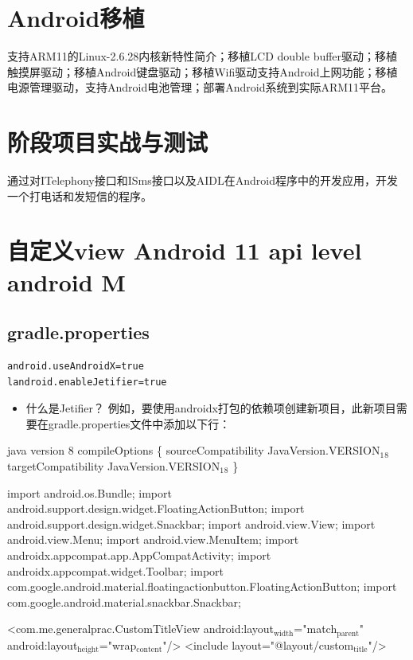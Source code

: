 \documentclass[9pt, b5paper]{article}
\begin{document}
\section{Android移植}
\label{sec-17}
支持ARM11的Linux-2.6.28内核新特性简介；移植LCD double buffer驱动；移植触摸屏驱动；移植Android键盘驱动；移植Wifi驱动支持Android上网功能；移植电源管理驱动，支持Android电池管理；部署Android系统到实际ARM11平台。
\section{阶段项目实战与测试}
\label{sec-18}
通过对ITelephony接口和ISms接口以及AIDL在Android程序中的开发应用，开发一个打电话和发短信的程序。

\section{自定义view Android 11 api level android M}
\label{sec-19}
\subsection{gradle.properties}
\label{sec-19-1}
\begin{verbatim}
android.useAndroidX=true
landroid.enableJetifier=true
\end{verbatim}
\begin{itemize}
\item 什么是Jetifier？ 例如，要使用androidx打包的依赖项创建新项目，此新项目需要在gradle.properties文件中添加以下行：
\end{itemize}

java version 8
 compileOptions \{
        sourceCompatibility JavaVersion.VERSION$_{\text{1}}$$_{\text{8}}$
        targetCompatibility JavaVersion.VERSION$_{\text{1}}$$_{\text{8}}$
    \}

import android.os.Bundle;
import android.support.design.widget.FloatingActionButton;
import android.support.design.widget.Snackbar;
import android.view.View;
import android.view.Menu;
import android.view.MenuItem;
import androidx.appcompat.app.AppCompatActivity;
import androidx.appcompat.widget.Toolbar;
import com.google.android.material.floatingactionbutton.FloatingActionButton;
import com.google.android.material.snackbar.Snackbar;

<com.me.generalprac.CustomTitleView
    android:layout$_{\text{width}}$="match$_{\text{parent}}$"
    android:layout$_{\text{height}}$="wrap$_{\text{content}}$"/>
<include layout="@layout/custom$_{\text{title}}$"/>
\end{document}
